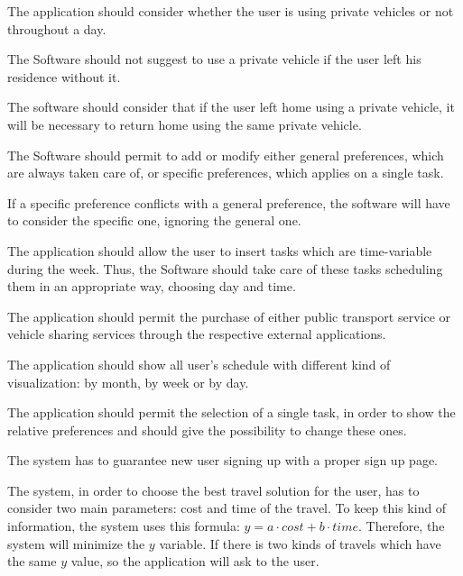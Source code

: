 \begin{requirementList}
    \item The application should consider whether the user is using private vehicles or not throughout a day.
    \begin{enumerate}[label={[}R 10.\arabic*{]}:]
    \item The Software should not suggest to use a private vehicle if the user left his residence without it.
   
    \item The software should consider that if the user left home using a private vehicle, it will be necessary to return home using the same private vehicle.
    \end{enumerate}
    
    \item The Software should permit to add or modify either general preferences, which are always taken care of, or specific preferences, which applies on a single task.
    \begin{enumerate}[label={[}R 11.\arabic*{]}:]
    \item If a specific preference conflicts with a general preference, the software will have to consider the specific one, ignoring the general one.
    \end{enumerate}
    
    \item The application should allow the user to insert tasks which are time-variable during the week. Thus, the Software should take care of these tasks scheduling them in an appropriate way, choosing day and time.
    
    \item The application should permit the purchase of either public transport service or vehicle sharing services through the respective external applications.
    
    \item The application should show all user's schedule with different kind of visualization: by month, by week or by day.
    
    \item The application should permit the selection of a single task, in order to show the relative preferences and should give the possibility to change these ones.
    
    \item The system has to guarantee new user signing up with a proper sign up page. 
    
    \item The system, in order to choose the best travel solution for the user, has to consider two main parameters: cost and time of the travel. To keep this kind of information, the system uses this formula: \( y = a \cdot cost + b \cdot time\). Therefore, the system will minimize the \(y\) variable. If there is two kinds of travels which have the same \(y\) value, so the application will ask to the user.
    

\end{requirementList}
